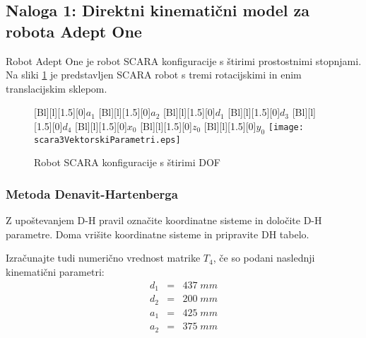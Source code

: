 \subsection{Naloga 1: Direktni kinematični model za robota Adept One}\label{scara}

Robot Adept One je robot SCARA konfiguracije s štirimi prostostnimi stopnjami.
Na sliki \ref{scara} je predstavljen SCARA robot s tremi rotacijskimi in enim
translacijskim sklepom.


\begin{figure}[h]
\centering {}[Bl][l][1.5][0]{$a_1$}
[Bl][l][1.5][0]{$a_2$}
[Bl][l][1.5][0]{$d_1$}
[Bl][l][1.5][0]{$d_3$}
[Bl][l][1.5][0]{$d_4$}
[Bl][l][1.5][0]{$x_0$}
[Bl][l][1.5][0]{$z_0$}
[Bl][l][1.5][0]{$y_0$}
\texttt{[image: scara3VektorskiParametri.eps]}
  \caption{\label{scara} Robot SCARA konfiguracije s štirimi DOF}
\end{figure}

\subsubsection{Metoda Denavit-Hartenberga}

Z upoštevanjem D-H pravil označite koordinatne sisteme in določite D-H parametre.
Doma vrišite koordinatne sisteme in pripravite DH tabelo.



Izračunajte tudi numerično vrednost matrike $T_4$, če so podani naslednji
kinematični parametri:
\begin{eqnarray}
d_1 &=& 437 \; mm \nonumber \\
d_2 &=& 200 \; mm \nonumber \\
a_1 &=& 425 \; mm \nonumber \\
a_2 &=& 375 \; mm \nonumber \\
\end{eqnarray}

